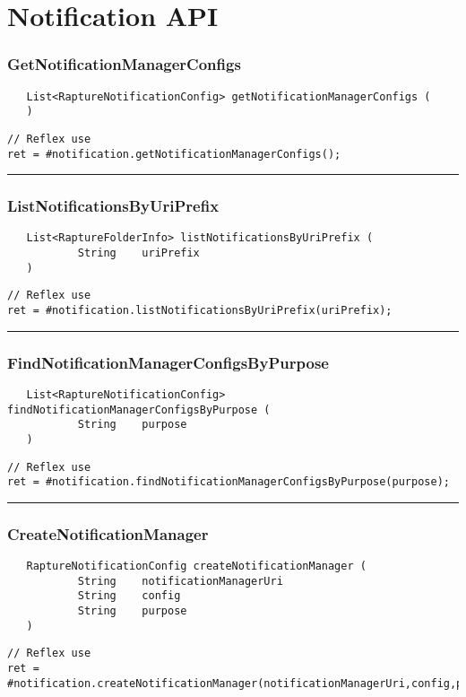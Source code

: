 \section{Notification API}

\subsubsection{GetNotificationManagerConfigs}
\label{Api:GetNotificationManagerConfigs}
\begin{verbatim}
   List<RaptureNotificationConfig> getNotificationManagerConfigs (
   )
\end{verbatim}
\begin{lstlisting}[language=reflex]
// Reflex use
ret = #notification.getNotificationManagerConfigs();
\end{lstlisting}



\rule{15cm}{2pt}
\subsubsection{ListNotificationsByUriPrefix}
\label{Api:ListNotificationsByUriPrefix}
\begin{verbatim}
   List<RaptureFolderInfo> listNotificationsByUriPrefix (
           String    uriPrefix
   )
\end{verbatim}
\begin{lstlisting}[language=reflex]
// Reflex use
ret = #notification.listNotificationsByUriPrefix(uriPrefix);
\end{lstlisting}



\rule{15cm}{2pt}
\subsubsection{FindNotificationManagerConfigsByPurpose}
\label{Api:FindNotificationManagerConfigsByPurpose}
\begin{verbatim}
   List<RaptureNotificationConfig> findNotificationManagerConfigsByPurpose (
           String    purpose
   )
\end{verbatim}
\begin{lstlisting}[language=reflex]
// Reflex use
ret = #notification.findNotificationManagerConfigsByPurpose(purpose);
\end{lstlisting}



\rule{15cm}{2pt}
\subsubsection{CreateNotificationManager}
\label{Api:CreateNotificationManager}
\begin{verbatim}
   RaptureNotificationConfig createNotificationManager (
           String    notificationManagerUri
           String    config
           String    purpose
   )
\end{verbatim}
\begin{lstlisting}[language=reflex]
// Reflex use
ret = #notification.createNotificationManager(notificationManagerUri,config,purpose);
\end{lstlisting}



